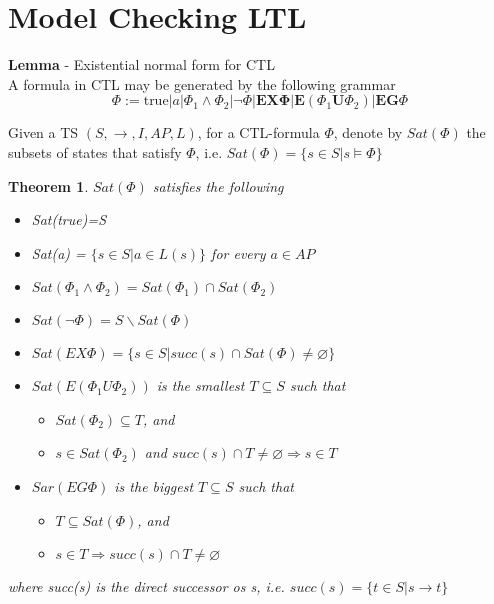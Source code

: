 \documentclass{article}[18pt]
\newtheorem{theorem}{Theorem}
\begin{document}
\section{Model Checking LTL}
\textbf{Lemma} - Existential normal form for CTL\\
A formula in CTL may be generated by the following grammar
$$\Phi:=\text {true}|a| \Phi_{1} \wedge \Phi_{2}|\neg \Phi| \mathbf{E X \Phi}\left|\mathbf{E}\left(\Phi_{1} \mathbf{U} \Phi_{2}\right)\right| \mathbf{E G} \Phi$$
\begin{definition}
Given a TS $(S,\rightarrow,I,AP,L)$, for a CTL-formula $\Phi$, denote by $Sat(\Phi)$ the subsets of states that satisfy $\Phi$, i.e. $Sat(\Phi)=\{s\in S|s\models \Phi\}$
\end{definition}
\begin{theorem}
$Sat(\Phi)$ satisfies the following
\begin{itemize}
	\item Sat(true)=S
	\item Sat(a) = $\{s\in S| a\in L(s)\}$ for every $a\in AP$
	\item $Sat(\Phi_1\land\Phi_2)=Sat(\Phi_1)\cap Sat(\Phi_2)$
	\item $Sat(\lnot\Phi)=S\backslash Sat(\Phi)$
	\item $Sat(EX\Phi)=\{s\in S| succ(s) \cap Sat(\Phi) \neq \varnothing\}$
	\item $Sat(E(\Phi_1U\Phi_2))$ is the smallest $T\subseteq S$ such that
	\begin{itemize}
		\item $Sat(\Phi_2)\subseteq T$, and
		\item $s\in Sat(\Phi_2)$ and $succ(s)\cap T\neq\varnothing\Rightarrow s\in T$
	\end{itemize}
	\item $Sar(EG\Phi)$ is the biggest $T\subseteq S$ such that
	\begin{itemize}
		\item $T\subseteq Sat(\Phi)$, and
		\item $s\in T \Rightarrow succ(s)\cap T \neq \varnothing$
	\end{itemize}
\end{itemize}
where succ(s) is the direct successor os s, i.e. $succ(s)=\{t\in S|s\rightarrow t\}$
\end{theorem}
\end{document}
